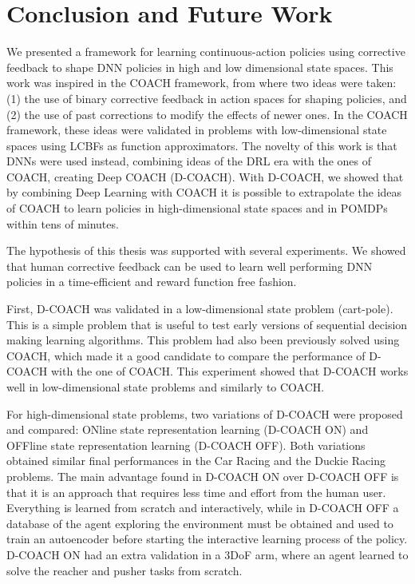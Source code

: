 \chapter{Conclusion and Future Work}
We presented a framework for learning continuous-action policies using corrective feedback to shape DNN policies in high and low dimensional state spaces. This work was inspired in the COACH framework, from where two ideas were taken: (1) the use of binary corrective feedback in action spaces for shaping policies, and (2) the use of past corrections to modify the effects of newer ones. In the COACH framework, these ideas were validated in problems with low-dimensional state spaces using LCBFs as function approximators. The novelty of this work is that DNNs were used instead, combining ideas of the DRL era with the ones of COACH, creating Deep COACH (D-COACH). With D-COACH, we showed that by combining Deep Learning with COACH it is possible to extrapolate the ideas of COACH to learn policies in high-dimensional state spaces and in POMDPs within tens of minutes. 

The hypothesis of this thesis was supported with several experiments. We showed that human corrective feedback can be used to learn well performing DNN policies in a time-efficient and reward function free fashion.

First, D-COACH was validated in a low-dimensional state problem (cart-pole). This is a simple problem that is useful to test early versions of sequential decision making learning algorithms. This problem had also been previously solved using COACH, which made it a good candidate to compare the performance of D-COACH with the one of COACH. This experiment showed that D-COACH works well in low-dimensional state problems and similarly to COACH. 

For high-dimensional state problems, two variations of D-COACH were proposed and compared: ONline state representation learning (D-COACH ON) and OFFline state representation learning (D-COACH OFF). Both variations obtained similar final performances in the Car Racing and the Duckie Racing problems. The main advantage found in D-COACH ON over D-COACH OFF is that it is an approach that requires less time and effort from the human user. Everything is learned from scratch and interactively, while in D-COACH OFF a database of the agent exploring the environment must be obtained and used to train an autoencoder before starting the interactive learning process of the policy. D-COACH ON had an extra validation in a 3DoF arm, where an agent learned to solve the reacher and pusher tasks from scratch.

